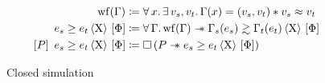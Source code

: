 \begin{figure}[tp]
    \begin{align*}
    		\wf{\datalangBisubst}
    		&\coloneqq
    		\forall \datalangVar \ldotp
    		\exists \datalangVal_s, \datalangVal_t \ldotp
    		\datalangBisubst (\datalangVar) = (\datalangVal_s, \datalangVal_t) \iSep
    		\datalangVal_s \iSimilar \datalangVal_t
    	\\
    		\iCsimv[\iProt]{\iPred}{\datalangExpr_s}{\datalangExpr_t}
    		&\coloneqq
    		\forall \datalangBisubst \ldotp
    		\wf{\datalangBisubst} \iSepImp
    		\iSimv[\iProt]{\iPred}{\datalangBisubst_s (\datalangExpr_s)}{\datalangBisubst_t (\datalangExpr_t)}
    	\\
    	   \iCsimvHoare[\iProt]{P}{\iPred}{\datalangExpr_s}{\datalangExpr_t}
    	   &\coloneqq
    	   \iPersistent \left( P \iSepImp \iCsimv[\iProt]{\iPred}{\datalangExpr_s}{\datalangExpr_t} \right)
    \end{align*}
    \caption{Closed simulation}
    \label{fig:csim}
\end{figure}